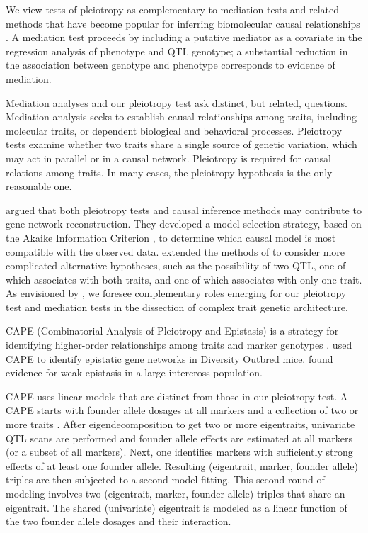 \documentclass[oneside]{book}\usepackage[]{graphicx}\usepackage[]{color}
\begin{document}
We view tests of pleiotropy as complementary to 
mediation tests and related methods that have become popular for
inferring biomolecular causal relationships
\citep{chick2016defining,schadt2005integrative,baron1986moderator}. A
mediation test proceeds by including a putative mediator as a
covariate in the regression analysis of phenotype and QTL genotype;
a substantial reduction in the association between
genotype and phenotype corresponds to evidence of mediation. 


Mediation analyses and our pleiotropy test ask distinct, but related, questions. Mediation analysis seeks to establish causal relationships among traits, including molecular traits, or dependent biological and behavioral processes. Pleiotropy tests examine whether two traits share a single source of genetic variation, which may act in parallel or in a causal network. Pleiotropy is required for causal relations among traits. In many cases, the pleiotropy hypothesis is the only reasonable one. 

\citet{schadt2005integrative} argued that
both pleiotropy tests and causal inference methods may contribute to gene network
reconstruction. They developed a model selection strategy, based on
the Akaike Information Criterion \citep{akaike1974new}, to determine which
causal model is most compatible with the observed data.
\citet{schadt2005integrative} extended the methods of
\citet{jiang1995multiple} to consider more complicated alternative
hypotheses, such as the possibility of two QTL, one of which
associates with both traits, and one of which associates with only one
trait. As envisioned by \citet{schadt2005integrative}, we foresee
complementary roles emerging for our pleiotropy test
and mediation tests in the dissection of complex trait genetic
architecture.

CAPE (Combinatorial Analysis of Pleiotropy and Epistasis) is a strategy for identifying higher-order relationships among traits and marker genotypes \citep{tyler2013cape}. 
\citet{tyler2017epistatic} used CAPE to identify epistatic gene networks in Diversity Outbred mice. \citet{tyler2016weak} found evidence for weak epistasis in a large intercross population. 

CAPE uses linear models that are distinct from those in our pleiotropy test. 
A CAPE starts with founder allele dosages at all markers and a collection of two or more 
traits \citep{tyler2017epistatic}. 
After eigendecomposition to get two or more eigentraits, univariate QTL scans are performed 
and founder allele effects are estimated at all markers (or a subset of all markers). 
Next, one identifies markers with sufficiently strong effects of at least one founder 
allele. 
Resulting (eigentrait, marker, founder allele) triples are then subjected to a second model 
fitting. 
This second round of modeling involves two (eigentrait, marker, founder allele) triples 
that share an eigentrait. 
The shared (univariate) eigentrait is modeled as a linear function of the two founder 
allele dosages and their interaction. 
\end{document}
